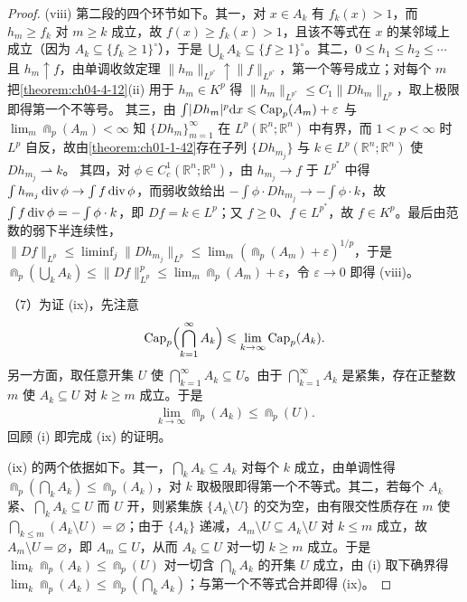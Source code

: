 \documentclass[../../main.tex]{subfiles}%
\begin{document}
\begin{proof}
(viii) 第二段的四个环节如下。其一，对 $x\in A_k$ 有 $f_k(x)>1$，而 $h_m\geqslant f_k$ 对 $m\geqslant k$ 成立，故 $f(x)\geqslant f_k(x)>1$，且该不等式在 $x$ 的某邻域上成立（因为 $A_k\subseteq\{f_k\geqslant1\}^{\circ}$），于是 $\bigcup_kA_k\subseteq\{f\geqslant1\}^{\circ}$。其二，$0\leqslant h_1\leqslant h_2\leqslant\cdots$ 且 $h_m\uparrow f$，由单调收敛定理 $\lVert h_m\rVert_{L^{p^*}}\uparrow\lVert f\rVert_{L^{p^*}}$，第一个等号成立；对每个 $m$ 把\cref{theorem:ch04-4-12}(ii) 用于 $h_m\in K^p$ 得 $\lVert h_m\rVert_{L^{p^*}}\leqslant C_1\lVert Dh_m\rVert_{L^p}$，取上极限即得第一个不等号。%
其三，由 $\int\lvert Dh_m\rvert^p\diff x\leqslant\Cap_p(A_m)+\varepsilon$ 与 $\lim_m\Cap_p(A_m)<\infty$ 知 $\{Dh_m\}_{m=1}^{\infty}$ 在 $L^p(\mathbb{R}^n;\mathbb{R}^n)$ 中有界，而 $1<p<\infty$ 时 $L^p$ 自反，故由\cref{theorem:ch01-1-42}存在子列 $\{Dh_{m_j}\}$ 与 $k\in L^p(\mathbb{R}^n;\mathbb{R}^n)$ 使 $Dh_{m_j}\rightharpoonup k$。%
其四，对 $\phi\in C_c^1(\mathbb{R}^n;\mathbb{R}^n)$，由 $h_{m_j}\to f$ 于 $L^{p^*}$ 中得 $\int h_{m_j}\diver\phi\to\int f\diver\phi$，而弱收敛给出 $-\int\phi\cdot Dh_{m_j}\to-\int\phi\cdot k$，故 $\int f\diver\phi=-\int\phi\cdot k$，即 $Df=k\in L^p$；又 $f\geqslant0$、$f\in L^{p^*}$，故 $f\in K^p$。最后由范数的弱下半连续性，$\lVert Df\rVert_{L^p}\leqslant\liminf_j\lVert Dh_{m_j}\rVert_{L^p}\leqslant\lim_m(\Cap_p(A_m)+\varepsilon)^{1/p}$，于是 $\Cap_p(\bigcup_kA_k)\leqslant\lVert Df\rVert_{L^p}^p\leqslant\lim_m\Cap_p(A_m)+\varepsilon$，令 $\varepsilon\to0$ 即得 (viii)。

（7）为证 (ix)，先注意
\begin{align*}
\Cap_p\Bigl(\bigcap_{k=1}^{\infty}A_k\Bigr)\leqslant\lim_{k\to\infty}\Cap_p(A_k).
\end{align*}
另一方面，取任意开集 $U$ 使 $\bigcap_{k=1}^{\infty}A_k\subseteq U$。由于 $\bigcap_{k=1}^{\infty}A_k$ 是紧集，存在正整数 $m$ 使 $A_k\subseteq U$ 对 $k\geqslant m$ 成立。于是
\begin{align*}
\lim_{k\to\infty}\Cap_p(A_k)\leqslant\Cap_p(U).
\end{align*}
回顾 (i) 即完成 (ix) 的证明。

(ix) 的两个依据如下。其一，$\bigcap_kA_k\subseteq A_k$ 对每个 $k$ 成立，由单调性得 $\Cap_p(\bigcap_kA_k)\leqslant\Cap_p(A_k)$，对 $k$ 取极限即得第一个不等式。其二，若每个 $A_k$ 紧、$\bigcap_kA_k\subseteq U$ 而 $U$ 开，则紧集族 $\{A_k\setminus U\}$ 的交为空，由有限交性质存在 $m$ 使 $\bigcap_{k\leqslant m}(A_k\setminus U)=\varnothing$；由于 $\{A_k\}$ 递减，$A_m\setminus U\subseteq A_k\setminus U$ 对 $k\leqslant m$ 成立，故 $A_m\setminus U=\varnothing$，即 $A_m\subseteq U$，从而 $A_k\subseteq U$ 对一切 $k\geqslant m$ 成立。于是 $\lim_k\Cap_p(A_k)\leqslant\Cap_p(U)$ 对一切含 $\bigcap_kA_k$ 的开集 $U$ 成立，由 (i) 取下确界得 $\lim_k\Cap_p(A_k)\leqslant\Cap_p(\bigcap_kA_k)$；与第一个不等式合并即得 (ix)。
\end{proof}
\end{document}
